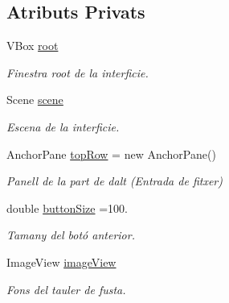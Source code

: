 \subsection*{Atributs Privats}
\begin{DoxyCompactItemize}
\item 
V\+Box \mbox{\hyperlink{class_gui_aa5fb03ea111e17f7ff7ae3d4ce32782a}{root}}
\begin{DoxyCompactList}\small\item\em Finestra root de la interficie. \end{DoxyCompactList}\item 
Scene \mbox{\hyperlink{class_gui_a0864db089f17216fd1901603a662e9d2}{scene}}
\begin{DoxyCompactList}\small\item\em Escena de la interficie. \end{DoxyCompactList}\item 
Anchor\+Pane \mbox{\hyperlink{class_gui_ab46ede23c79d98785ce4482e11c6f19e}{top\+Row}} = new Anchor\+Pane()
\begin{DoxyCompactList}\small\item\em Panell de la part de dalt (Entrada de fitxer) \end{DoxyCompactList}\item 
double \mbox{\hyperlink{class_gui_af49145c30968bfd148efa7e77df8082e}{button\+Size}} =100.
\begin{DoxyCompactList}\small\item\em Tamany del botó anterior. \end{DoxyCompactList}\item 
Image\+View \mbox{\hyperlink{class_gui_afdcd258194a961c45a4bf50d67cc3486}{image\+View}}
\begin{DoxyCompactList}\small\item\em Fons del tauler de fusta. \end{DoxyCompactList}\end{DoxyCompactItemize}
